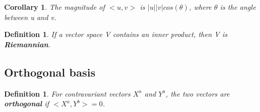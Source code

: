 \documentclass{book}
\newtheorem{defn}[equation]{Definition}
\newtheorem{coro}[equation]{Corollary}
\begin{document}
\begin{coro}
	The magnitude of $<u,v>$ is $|u||v|cos(\theta)$, where $\theta$ is the angle between u and v. 
\end{coro}

\begin{defn}
	If a vector space V contains an inner product, then V is \textbf{Riemannian}.
	\end{defn}



\subsection{Orthogonal basis}

\begin{defn}
	For contravariant vectors $X^a$ and $Y^a$, the two vectors are \textbf{orthogonal} if $<X^a,Y^b> = 0$. 
\end{defn}
\end{document}
